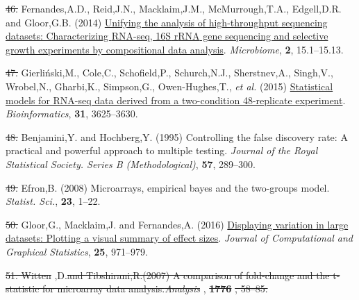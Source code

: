 \documentclass[
]{article}
\newlength{\cslhangindent}
\newenvironment{CSLReferences}[2] %
 {\begin{list}{}{%
  \setlength{\itemindent}{0pt}
  \setlength{\leftmargin}{0pt}
  \setlength{\parsep}{0pt}
  \ifodd #1
   \setlength{\leftmargin}{\cslhangindent}
   \setlength{\itemindent}{-1\cslhangindent}
  \fi
  \setlength{\itemsep}{#2\baselineskip}}}
 {\end{list}}
\providecommand{\DIFadd}[1]{{\protect\color{blue}\uwave{#1}}} %
\providecommand{\DIFdel}[1]{{\protect\color{red}\sout{#1}}}                      %
\providecommand{\DIFaddbegin}{} %
\providecommand{\DIFaddend}{} %
\providecommand{\DIFdelbegin}{} %
\providecommand{\DIFdelend}{} %
\newcommand{\DIFscaledelfig}{0.5}
\newlength{\DIFdelgraphicswidth} %
\newlength{\DIFdelgraphicsheight} %
\newcommand{\DIFaddincludegraphics}[2][]{{\color{blue}\fbox{\DIFOincludegraphics[#1]{#2}}}} %
\newcommand{\DIFdelincludegraphics}[2][]{%
\sbox{\DIFdelgraphicsbox}{\DIFOincludegraphics[#1]{#2}}%
\settoboxwidth{\DIFdelgraphicswidth}{\DIFdelgraphicsbox} %
\settoboxtotalheight{\DIFdelgraphicsheight}{\DIFdelgraphicsbox} %
\scalebox{\DIFscaledelfig}{%
\parbox[b]{\DIFdelgraphicswidth}{\usebox{\DIFdelgraphicsbox}\\[-\baselineskip] \rule{\DIFdelgraphicswidth}{0em}}\llap{\resizebox{\DIFdelgraphicswidth}{\DIFdelgraphicsheight}{%
\setlength{\unitlength}{\DIFdelgraphicswidth}%
\begin{picture}(1,1)%
\thicklines\linethickness{2pt} %
{\color[rgb]{1,0,0}\put(0,0){\framebox(1,1){}}}%
{\color[rgb]{1,0,0}\put(0,0){\line( 1,1){1}}}%
{\color[rgb]{1,0,0}\put(0,1){\line(1,-1){1}}}%
\end{picture}%
}\hspace*{3pt}}} %
} %
\DeclareRobustCommand{\DIFaddbegin}{\DIFOaddbegin \let\includegraphics\DIFaddincludegraphics} %
\DeclareRobustCommand{\DIFaddend}{\DIFOaddend \let\includegraphics\DIFOincludegraphics} %
\DeclareRobustCommand{\DIFdelbegin}{\DIFOdelbegin \let\includegraphics\DIFdelincludegraphics} %
\DeclareRobustCommand{\DIFdelend}{\DIFOaddend \let\includegraphics\DIFOincludegraphics} %
\begin{document}
\begin{CSLReferences}{1}{1}
\DIFdelbegin \DIFdel{46. }\DIFdelend \DIFaddbegin \DIFadd{43. }\DIFaddend Fernandes,A.D., Reid,J.N., Macklaim,J.M., McMurrough,T.A.,
Edgell,D.R. and Gloor,G.B. (2014)
\href{https://doi.org/10.1186/2049-2618-2-15}{Unifying the analysis of
high-throughput sequencing datasets: Characterizing {RNA}-seq, 16{S}
r{RNA} gene sequencing and selective growth experiments by compositional
data analysis}. \emph{Microbiome}, \textbf{2}, 15.1--15.13.

\DIFdelbegin \DIFdel{47. }\DIFdelend \DIFaddbegin \DIFadd{44. }\DIFaddend Gierliński,M., Cole,C., Schofield,P., Schurch,N.J., Sherstnev,A.,
Singh,V., Wrobel,N., Gharbi,K., Simpson,G., Owen-Hughes,T., \emph{et
al.} (2015)
\href{https://doi.org/10.1093/bioinformatics/btv425}{Statistical models
for RNA-seq data derived from a two-condition 48-replicate experiment}.
\emph{Bioinformatics}, \textbf{31}, 3625--3630.

\DIFdelbegin \DIFdel{48. }\DIFdelend \DIFaddbegin \DIFadd{45. }\DIFaddend Benjamini,Y. and Hochberg,Y. (1995) Controlling the false discovery
rate: A practical and powerful approach to multiple testing.
\emph{Journal of the Royal Statistical Society. Series B
(Methodological)}, \textbf{57}, 289--300.

\DIFdelbegin \DIFdel{49. }\DIFdelend \DIFaddbegin \DIFadd{46. }\DIFaddend Efron,B. (2008) Microarrays, empirical bayes and the two-groups
model. \emph{Statist. Sci.}, \textbf{23}, 1--22.

\DIFdelbegin \DIFdel{50. }\DIFdelend \DIFaddbegin \DIFadd{47. }\DIFaddend Gloor,G., Macklaim,J. and Fernandes,A. (2016)
\href{https://doi.org/10.1080/10618600.2015.1131161}{Displaying
variation in large datasets: Plotting a visual summary of effect sizes}.
\emph{Journal of Computational and Graphical Statistics}, \textbf{25},
971--979.

\DIFdelbegin {}
\DIFdel{51. Witten}\DIFdelend \DIFaddbegin {}
\DIFadd{48. Rocha}\DIFaddend ,D.\DIFdelbegin \DIFdel{and Tibshirani,R.(2007) A comparison of fold-change and
the t-statistic for microarray data analysis.}\emph{\DIFdel{Analysis}}%
\DIFdelend \DIFaddbegin \DIFadd{J.P.G.}\DIFaddend , \DIFdelbegin \textbf{\DIFdel{1776}}%
\DIFdel{, 58--85.}%


\end{CSLReferences}
\end{document}

